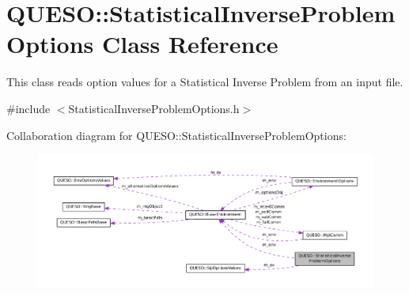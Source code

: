 \hypertarget{class_q_u_e_s_o_1_1_statistical_inverse_problem_options}{\section{Q\-U\-E\-S\-O\-:\-:Statistical\-Inverse\-Problem\-Options Class Reference}
\label{class_q_u_e_s_o_1_1_statistical_inverse_problem_options}
}


This class reads option values for a Statistical Inverse Problem from an input file.  




{\ttfamily \#include $<$Statistical\-Inverse\-Problem\-Options.\-h$>$}



Collaboration diagram for Q\-U\-E\-S\-O\-:\-:Statistical\-Inverse\-Problem\-Options\-:
\nopagebreak
\begin{figure}[H]
\begin{center}
\leavevmode
\includegraphics[width=350pt]{class_q_u_e_s_o_1_1_statistical_inverse_problem_options__coll__graph}
\end{center}
\end{figure}
